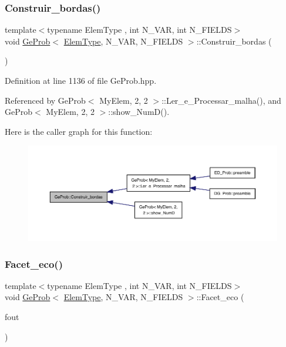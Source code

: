 \subsubsection{\texorpdfstring{Construir\+\_\+bordas()}{Construir\_bordas()}}
{\footnotesize\ttfamily template$<$typename Elem\+Type , int N\+\_\+\+V\+AR, int N\+\_\+\+F\+I\+E\+L\+DS$>$ \\
void \hyperlink{classGeProb}{Ge\+Prob}$<$ \hyperlink{spectral_8h_aaa2c1a7b2d1b12c590d730fe6ac839fa}{Elem\+Type}, N\+\_\+\+V\+AR, N\+\_\+\+F\+I\+E\+L\+DS $>$\+::Construir\+\_\+bordas (\begin{DoxyParamCaption}{ }\end{DoxyParamCaption})}



Definition at line 1136 of file Ge\+Prob.\+hpp.



Referenced by Ge\+Prob$<$ My\+Elem, 2, 2 $>$\+::\+Ler\+\_\+e\+\_\+\+Processar\+\_\+malha(), and Ge\+Prob$<$ My\+Elem, 2, 2 $>$\+::show\+\_\+\+Num\+D().

Here is the caller graph for this function\+:
\nopagebreak
\begin{figure}[H]
\begin{center}
\leavevmode
\includegraphics[width=350pt]{classGeProb_ab622a6354ec337bab6c2563049b0db4f_icgraph}
\end{center}
\end{figure}
\mbox{\label{classGeProb_ae30b85570c7c33bb4429f9ed91532807}} 
\subsubsection{\texorpdfstring{Facet\+\_\+eco()}{Facet\_eco()}}
{\footnotesize\ttfamily template$<$typename Elem\+Type , int N\+\_\+\+V\+AR, int N\+\_\+\+F\+I\+E\+L\+DS$>$ \\
void \hyperlink{classGeProb}{Ge\+Prob}$<$ \hyperlink{spectral_8h_aaa2c1a7b2d1b12c590d730fe6ac839fa}{Elem\+Type}, N\+\_\+\+V\+AR, N\+\_\+\+F\+I\+E\+L\+DS $>$\+::Facet\+\_\+eco (\begin{DoxyParamCaption}\item[{F\+I\+LE $\ast$}]{fout }\end{DoxyParamCaption})}



